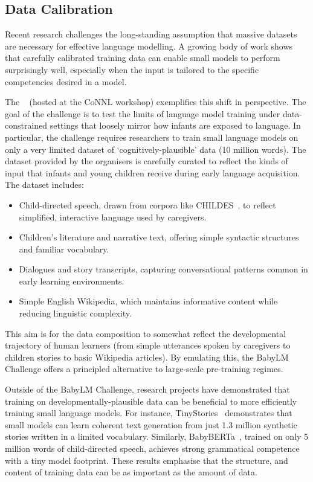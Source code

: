 \subsection{Data Calibration}
Recent research challenges the long-standing assumption that massive datasets are necessary for effective language modelling. A growing body of work shows that carefully calibrated training data can enable small models to perform surprisingly well, especially when the input is tailored to the specific competencies desired in a model.

The ~\citep{warstadt2023babylm1, conll2024babylm2} (hosted at the CoNNL workshop) exemplifies this shift in perspective. The goal of the challenge is to test the limits of language model training under data-constrained settings that loosely mirror how infants are exposed to language. In particular, the challenge requires researchers to train small language models on only a very limited dataset of `cognitively-plausible' data (10 million words). The dataset provided by the organisers is carefully curated to reflect the kinds of input that infants and young children receive during early language acquisition. The dataset includes:

\begin{itemize}
    \item Child-directed speech, drawn from corpora like CHILDES~\citep{macwhinney2000childes}, to reflect simplified, interactive language used by caregivers.
    \item Children's literature and narrative text, offering simple syntactic structures and familiar vocabulary.
    \item Dialogues and story transcripts, capturing conversational patterns common in early learning environments.
    \item Simple English Wikipedia, which maintains informative content while reducing linguistic complexity.
\end{itemize}

This aim is for the data composition to somewhat reflect the developmental trajectory of human learners (from simple utterances spoken by caregivers to children stories to basic Wikipedia articles). By emulating this, the BabyLM Challenge offers a principled alternative to large-scale pre-training regimes.

Outside of the BabyLM Challenge, research projects have demonstrated that training on developmentally-plausible data can be beneficial to more efficiently training small language models. For instance, TinyStories~\citep{eldan2023tinystories} demonstrates that small models can learn coherent text generation from just 1.3 million synthetic stories written in a limited vocabulary. Similarly, BabyBERTa~\citep{huebner2021babyberta}, trained on only 5 million words of child-directed speech, achieves strong grammatical competence with a tiny model footprint. These results emphasise that the structure, and content of training data can be as important as the amount of data. 

